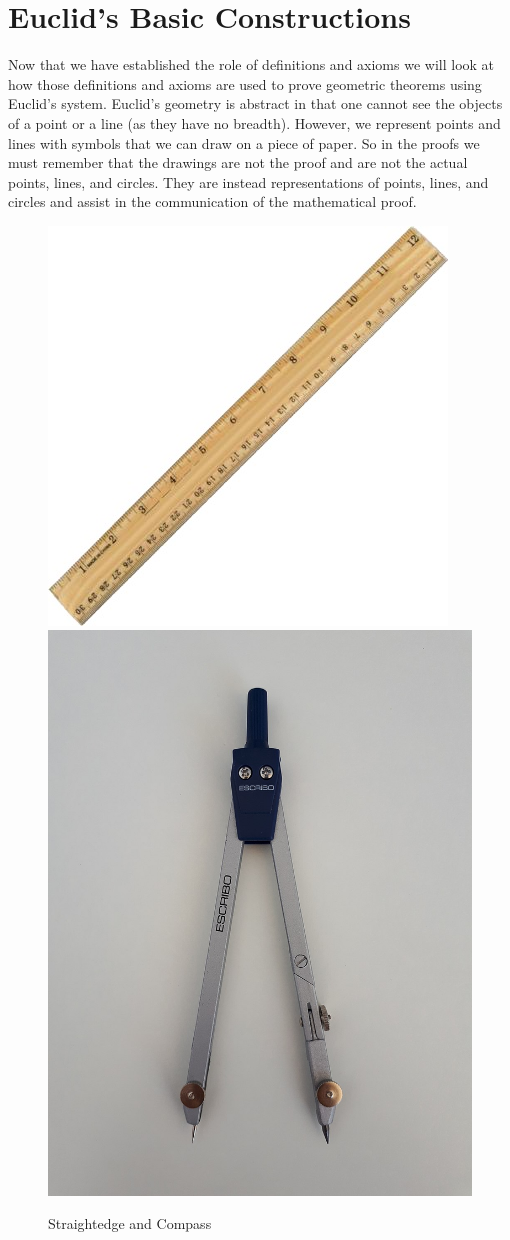 \documentclass[
]{book}
\theoremstyle{definition}
\theoremstyle{definition}
\theoremstyle{definition}
\theoremstyle{definition}
\theoremstyle{remark}
\begin{document}
\hypertarget{euclids-basic-constructions}{%
\section{Euclid's Basic Constructions}\label{euclids-basic-constructions}}

Now that we have established the role of definitions and axioms we will look at how those definitions and axioms are used to prove geometric theorems using Euclid's system. Euclid's geometry is abstract in that one cannot see the objects of a point or a line (as they have no breadth). However, we represent points and lines with symbols that we can draw on a piece of paper. So in the proofs we must remember that the drawings are not the proof and are not the actual points, lines, and circles. They are instead representations of points, lines, and circles and assist in the communication of the mathematical proof.

\begin{figure}

{\centering \includegraphics[width=0.48\linewidth]{images/Ruler} \includegraphics[width=0.48\linewidth]{images/Compass} 

}

\caption{Straightedge and Compass}\label{fig:Straightedge-Compass}
\end{figure}
\end{document}
